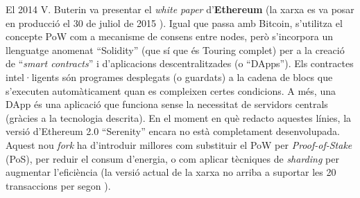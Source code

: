 \documentclass[11pt,a4paper]{article}
\begin{document}
El 2014 V. Buterin va presentar el \textit{white paper} d'\textbf{Ethereum} \cite{vuterin2014} (la xarxa es va posar en producció el 30 de juliol de 2015 \cite{tual2015}). Igual que passa amb Bitcoin, s'utilitza el concepte PoW com a mecanisme de consens entre nodes, però s'incorpora un llenguatge anomenat ``Solidity'' (que sí que és Touring complet) per a la creació de ``\textit{smart contracts}'' i d'aplicacions descentralitzades (o ``DApps''). Els contractes intel·ligents són programes desplegats (o guardats) a la cadena de blocs que s'executen automàticament quan es compleixen certes condicions. A més, una DApp és una aplicació que funciona sense la necessitat de servidors centrals (gràcies a la tecnologia descrita). En el moment en què redacto aquestes línies, la versió d'Ethereum 2.0 ``Serenity'' encara no està completament desenvolupada. Aquest nou \textit{fork} ha d'introduir millores com substituir el PoW per \textit{Proof-of-Stake} (PoS), per reduir el consum d'energia, o com aplicar tècniques de \textit{sharding} per augmentar l'eficiència (la versió actual de la xarxa no arriba a suportar les 20 transaccions per segon \cite{mech2018}).
\end{document}
